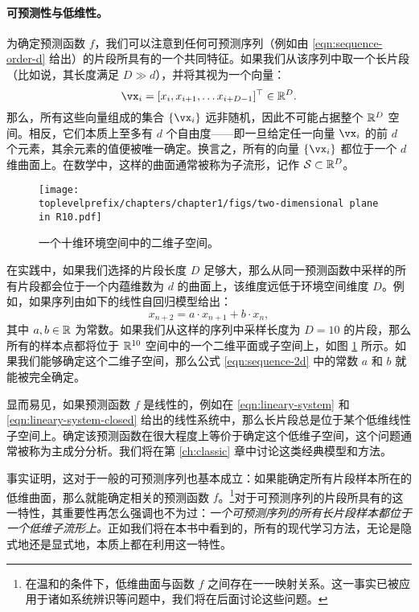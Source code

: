 \documentclass[../../book-main.tex]{subfiles}
\begin{document}
\paragraph{可预测性与低维性。}
为确定预测函数 $f$，我们可以注意到任何可预测序列（例如由 \eqref{eqn:sequence-order-d} 给出）的片段所具有的一个共同特征。如果我们从该序列中取一个长片段（比如说，其长度满足 $D \gg d$），并将其视为一个向量：
\begin{equation}
    \vx_i = [x_i, x_{i+1}, \ldots x_{i+D-1}]^\top \in \mathbb{R}^D.
\end{equation}
那么，所有这些向量组成的集合 $\{\vx_i\}$ 远非随机，因此不可能占据整个 $\mathbb{R}^D$ 空间。相反，它们本质上至多有 $d$ 个自由度——即一旦给定任一向量 $\vx_i$ 的前 $d$ 个元素，其余元素的值便被唯一确定。换言之，所有的向量 $\{\vx_i\}$ 都位于一个 $d$ 维曲面上。在数学中，这样的曲面通常被称为子流形，记作 $\mathcal{S} \subset \mathbb{R}^D$。

\begin{figure}[t]
\centering
\texttt{[image: \\toplevelprefix/chapters/chapter1/figs/two-dimensional plane in R10.pdf]}
    \caption{一个十维环境空间中的二维子空间。}
    \label{fig:lowdimplane}
\end{figure}
在实践中，如果我们选择的片段长度 $D$ 足够大，那么从同一预测函数中采样的所有片段都会位于一个内蕴维数为 $d$ 的曲面上，该维度远低于环境空间维度 $D$。例如，如果序列由如下的线性自回归模型给出：
\begin{equation}
    x_{n+2} = a\cdot x_{n+1} + b\cdot x_n,
    \label{eqn:sequence-2d}
\end{equation}
其中 $a, b \in \mathbb{R}$ 为常数。如果我们从这样的序列中采样长度为 $D =10$ 的片段，那么所有的样本点都将位于 $\mathbb{R}^{10}$ 空间中的一个二维平面或子空间上，如图 \ref{fig:lowdimplane} 所示。如果我们能够确定这个二维子空间，那么公式 \eqref{eqn:sequence-2d} 中的常数 $a$ 和 $b$ 就能被完全确定。

显而易见，如果预测函数 $f$ 是线性的，例如在 \eqref{eqn:lineary-system} 和 \eqref{eqn:lineary-system-closed} 给出的线性系统中，那么长片段总是位于某个低维线性子空间上。确定该预测函数在很大程度上等价于确定这个低维子空间，这个问题通常被称为主成分分析。我们将在第 \ref{ch:classic} 章中讨论这类经典模型和方法。

事实证明，这对于一般的可预测序列也基本成立：如果能确定所有片段样本所在的低维曲面，那么就能确定相关的预测函数 $f$。\footnote{在温和的条件下，低维曲面与函数 $f$ 之间存在一一映射关系。这一事实已被应用于诸如系统辨识等问题中，我们将在后面讨论这些问题。}对于可预测序列的片段所具有的这一特性，其重要性再怎么强调也不为过：{\em 一个可预测序列的所有长片段样本都位于一个低维子流形上。}正如我们将在本书中看到的，所有的现代学习方法，无论是隐式地还是显式地，本质上都在利用这一特性。%
\end{document}
